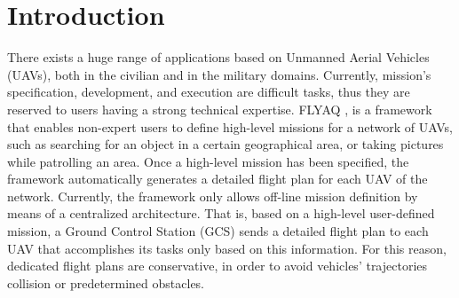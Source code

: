 \documentclass[letterpaper, 10 pt, conference]{ieeeconf}
\begin{document}
\section{Introduction}\label{sec:Introduction}
There exists a huge range of applications based on Unmanned Aerial Vehicles (UAVs), both in the civilian and in the military domains.
Currently, mission's specification, development, and execution are difficult tasks, thus they are reserved to users having a strong technical expertise.
%
FLYAQ \cite{FlyAQ:2015},\cite{FLYAQ:2016} is a framework that enables non-expert users to define high-level missions for a network of UAVs, such as searching for an object in a certain geographical area, or taking pictures while patrolling an area. Once a high-level mission has been specified, the framework automatically generates a detailed flight plan for each UAV of the network. 
%
Currently, the framework only allows off-line mission definition by means of a centralized architecture. That is, based on a high-level user-defined mission, a Ground Control Station (GCS) sends a detailed flight plan to each UAV that accomplishes its tasks only based on this information. 
For this reason, dedicated flight plans are conservative, in order to avoid vehicles' trajectories collision or predetermined obstacles.
\end{document}
